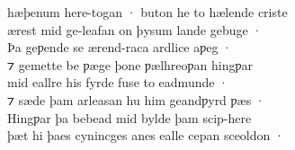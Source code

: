 \documentclass[10pt]{book}
\begin{document}
\begin{center}
{h\ae{}þenum here-togan · buton he to h\ae{}lende criste \\
\ae{}rest mid ge-leafan on þysum lande gebuge · \\
Þa geƿende se \ae{}rend-raca ardlice aƿeg · \\
⁊ gemette be ƿ\ae{}ge þone ƿ\ae{}lhreoƿan hingƿar \\
mid eallre his fyrde fuse to eadmunde · \\
⁊ s\ae{}de þam arleasan hu him geandƿyrd ƿ\ae{}s · \\
Hingƿar þa bebead mid bylde þam scip-here \\
þ\ae{}t hi þaes cynincges anes ealle cepan sceoldon · \\
}
\end{center}


\settowidth{}
\end{document}
